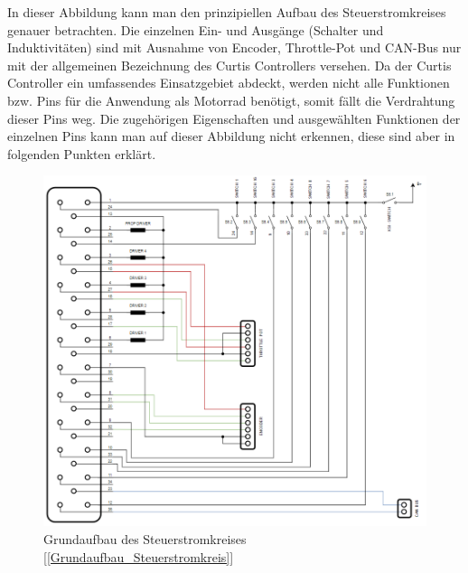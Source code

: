 \newpage
In dieser Abbildung kann man den prinzipiellen Aufbau des Steuerstromkreises genauer betrachten. Die einzelnen Ein- und Ausgänge (Schalter und Induktivitäten) sind mit Ausnahme von Encoder, Throttle-Pot und CAN-Bus nur mit der allgemeinen Bezeichnung des Curtis Controllers versehen. Da der Curtis Controller ein umfassendes Einsatzgebiet abdeckt, werden nicht alle Funktionen bzw. Pins für die Anwendung als Motorrad benötigt, somit fällt die Verdrahtung dieser Pins weg. Die zugehörigen Eigenschaften und ausgewählten Funktionen der einzelnen Pins kann man auf dieser Abbildung nicht erkennen, diese sind aber in folgenden Punkten erklärt.
\vspace{5mm}

\begin{figure}[H]
	\begin{center}
		\includegraphics[scale=0.67]{figures/Antrieb/Antrieb_Steuerstromkreis.png}
		\caption{Grundaufbau des Steuerstromkreises [\ref{Grundaufbau_Steuerstromkreis}]}
	\end{center}
\end{figure}

\newpage

